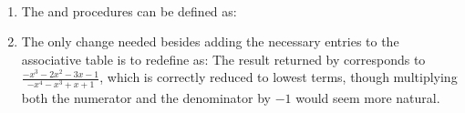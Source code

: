 \begin{exe}[2.97]
    \ \vspace{-20pt}
    \begin{enumerate}
        \item The  and  procedures can be 
            defined as:
        \item The only change needed besides adding the necessary entries to the 
            associative table is to redefine  as:
            The result returned by  corresponds to
            $\frac{-x^3 - 2x^2 - 3x - 1}{-x^4 - x^3 + x + 1}$, which is 
            correctly reduced to lowest terms, though multiplying both the 
            numerator and the denominator by $-1$ would seem more natural.
    \end{enumerate}
\end{exe}
